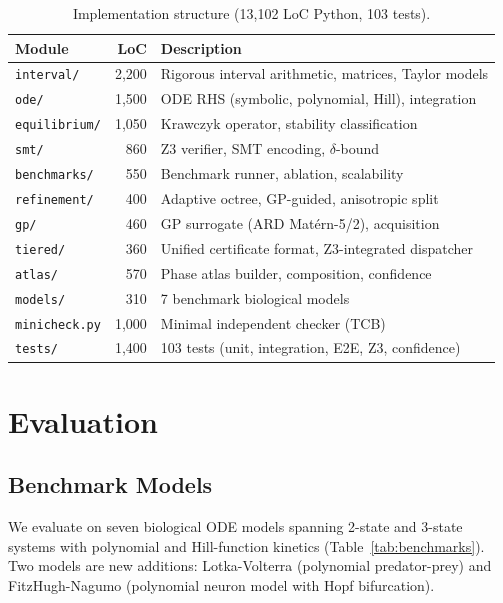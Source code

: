 \documentclass[11pt]{article}
\begin{document}
\begin{table}[t]
\centering
\caption{Implementation structure (13,102 LoC Python, 103 tests).}
\label{tab:code}
\small
\begin{tabular}{@{}lrl@{}}
\toprule
Module & LoC & Description \\
\midrule
\texttt{interval/}    & 2,200 & Rigorous interval arithmetic, matrices, Taylor models \\
\texttt{ode/}          & 1,500 & ODE RHS (symbolic, polynomial, Hill), integration \\
\texttt{equilibrium/}  & 1,050 & Krawczyk operator, stability classification \\
\texttt{smt/}          & 860   & Z3 verifier, SMT encoding, $\delta$-bound \\
\texttt{benchmarks/}   & 550   & Benchmark runner, ablation, scalability \\
\texttt{refinement/}   & 400   & Adaptive octree, GP-guided, anisotropic split \\
\texttt{gp/}           & 460   & GP surrogate (ARD Mat\'{e}rn-5/2), acquisition \\
\texttt{tiered/}       & 360   & Unified certificate format, Z3-integrated dispatcher \\
\texttt{atlas/}        & 570   & Phase atlas builder, composition, confidence \\
\texttt{models/}       & 310   & 7 benchmark biological models \\
\texttt{minicheck.py}  & 1,000 & Minimal independent checker (TCB) \\
\texttt{tests/}        & 1,400 & 103 tests (unit, integration, E2E, Z3, confidence) \\
\bottomrule
\end{tabular}
\end{table}

\section{Evaluation}
\label{sec:eval}

\subsection{Benchmark Models}

We evaluate on seven biological ODE models spanning 2-state and 3-state systems with polynomial and Hill-function kinetics (Table~\ref{tab:benchmarks}).
Two models are new additions: Lotka-Volterra (polynomial predator-prey) and FitzHugh-Nagumo (polynomial neuron model with Hopf bifurcation).
\end{document}
